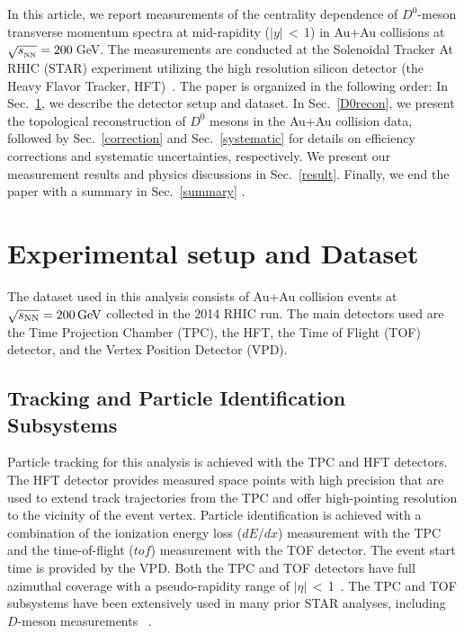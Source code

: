 \documentclass[%
 reprint,	
showpacs,
 amsmath,amssymb,
 aps,
 prc,
]{revtex4-1}
\begin{document}
In this article, we report measurements of the centrality dependence of $D^0$-meson transverse momentum spectra at mid-rapidity ($|y|$\,$<$\,1) in Au+Au collisions at $\sqrt{s_{_{\rm NN}}} = 200$\,GeV. The measurements are conducted at the Solenoidal Tracker At RHIC (STAR) experiment utilizing the high resolution silicon detector (the Heavy Flavor Tracker, HFT)~\cite{Contin:2017mck}. The paper is organized in the following order: In Sec.~\ref{dataset}, we describe the detector setup and dataset. In Sec.~\ref{D0recon}, we present the topological reconstruction of $D^0$ mesons in the Au+Au collision data, followed by Sec.~\ref{correction} and Sec.~\ref{systematic} for details on efficiency corrections and systematic uncertainties, respectively. We present our measurement results and physics discussions in Sec.~\ref{result}. Finally, we end the paper with a summary in Sec.~\ref{summary} .

\section{Experimental setup and Dataset}
\label{dataset}

The dataset used in this analysis consists of Au+Au collision events at ${\sqrt{s_{\rm NN}} = \rm{200\,GeV}}$ collected in the 2014 RHIC run. The main detectors used are the Time Projection Chamber (TPC), the HFT, the Time of Flight (TOF) detector, and the Vertex Position Detector (VPD). 

\subsection{Tracking and Particle Identification Subsystems}
\label{dataset:tpctof}

Particle tracking for this analysis is achieved with the TPC and HFT detectors. The HFT detector provides measured space points with high precision that are used to extend track trajectories from the TPC and offer high-pointing resolution to the vicinity of the event vertex. Particle identification is achieved with a combination of the ionization energy loss ($dE/dx$) measurement with the TPC and the time-of-flight ($tof$) measurement with the TOF detector. The event start time is provided by the VPD. Both the TPC and TOF detectors have full azimuthal coverage with a pseudo-rapidity range of $|\eta|$\,$<$\,1~\cite{TPC,TOF}. The TPC and TOF subsystems have been extensively used in many prior STAR analyses, including $D$-meson measurements ~\cite{Star_D_pp,Star_D_RAA,Adamczyk:2015ukd}.
\end{document}
